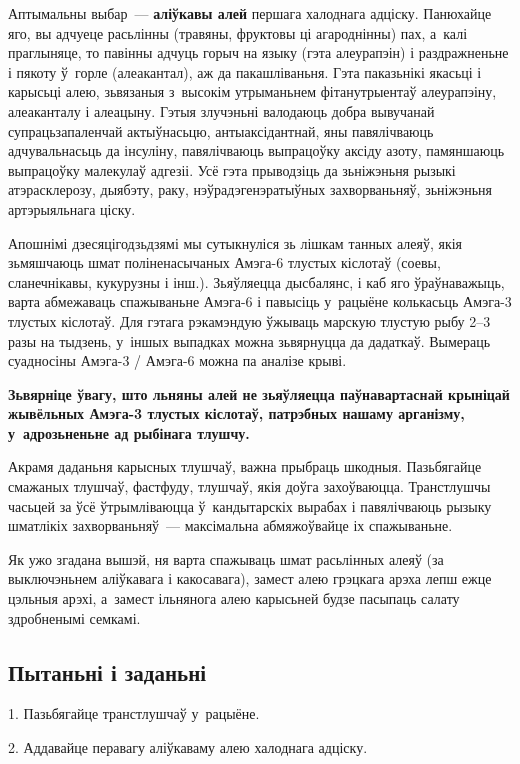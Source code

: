Аптымальны выбар~--- \textbf{аліўкавы алей} першага халоднага адціску. Панюхайце яго, вы адчуеце расьлінны (травяны, фруктовы ці агароднінны) пах, а~калі праглыняце, то павінны адчуць горыч на языку (гэта алеурапэін) і раздражненьне і пякоту ў~горле (алеакантал), аж да пакашліваньня. Гэта паказьнікі якасьці і карысьці алею, зьвязаныя з~высокім утрыманьнем фітанутрыентаў алеурапэіну, алеаканталу і алеацыну. Гэтыя злучэньні валодаюць добра вывучанай супрацьзапаленчай актыўнасьцю, антыаксідантнай, яны павялічваюць адчувальнасьць да інсуліну, павялічваюць выпрацоўку аксіду азоту, памяншаюць выпрацоўку малекулаў адгезіі. Усё гэта прыводзіць да зьніжэньня рызыкі атэрасклерозу, дыябэту, раку, нэўрадэгенэратыўных захворваньняў, зьніжэньня артэрыяльнага ціску.

Апошнімі дзесяцігодзьдзямі мы сутыкнуліся зь лішкам танных алеяў, якія зьмяшчаюць шмат поліненасычаных Амэга-6 тлустых кіслотаў (соевы, сланечнікавы, кукурузны і інш.). Зьяўляецца дысбалянс, і каб яго ўраўнаважыць, варта абмежаваць спажываньне Амэга-6 і павысіць у~рацыёне колькасьць Амэга-3 тлустых кіслотаў. Для гэтага рэкамэндую ўжываць марскую тлустую рыбу 2--3 разы на тыдзень, у~іншых выпадках можна зьвярнуцца да дадаткаў. Вымераць суадносіны Амэга-3 / Амэга-6 можна па аналізе крыві. 

\textbf{Зьвярніце ўвагу, што льняны алей не зьяўляецца паўнавартаснай крыніцай жывёльных Амэга-3 тлустых кіслотаў, патрэбных нашаму арганізму, у~адрозьненьне ад рыбінага тлушчу.}

Акрамя даданьня карысных тлушчаў, важна прыбраць шкодныя. Пазьбягайце смажаных тлушчаў, фастфуду, тлушчаў, якія доўга захоўваюцца. Транстлушчы часьцей за ўсё ўтрымліваюцца ў~кандытарскіх вырабах і павялічваюць рызыку шматлікіх захворваньняў~--- максімальна абмяжоўвайце іх спажываньне. 

Як ужо згадана вышэй, ня варта спажываць шмат расьлінных алеяў (за выключэньнем аліўкавага і какосавага), замест алею грэцкага арэха лепш ежце цэльныя арэхі, а~замест ільнянога алею карысьней будзе пасыпаць салату здробненымі семкамі.

\subsection*{Пытаньні і заданьні}

1. Пазьбягайце транстлушчаў у~рацыёне.

2. Аддавайце перавагу аліўкаваму алею халоднага адціску.

